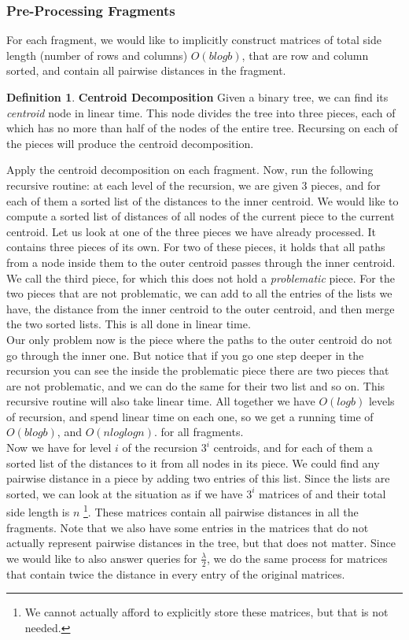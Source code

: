 \documentclass[11pt,a4paper]{article}
\theoremstyle{definition}
\newtheorem{definition}{Definition}
\theoremstyle{remark}
\begin{document}
\subsubsection{Pre-Processing Fragments} \label{Pre-Processing Fragments}
For each fragment, we would like to implicitly construct matrices of total side length (number of rows and columns) $O(blogb)$, that are row and column sorted, and contain all pairwise distances in the fragment.

\begin{definition} \textbf{Centroid Decomposition} %
Given a binary tree, we can find its \textit{centroid} node in linear time. This node divides the tree into three pieces, each of which has no more than half of the nodes of the entire tree. Recursing on each of the pieces will produce the centroid decomposition.
\end{definition}

Apply the centroid decomposition on each fragment. Now, run the following recursive routine: at each level of the recursion, we are given 3 pieces, and for each of them a sorted list of the distances to the inner centroid. We would like to compute a sorted list of distances of all nodes of the current piece to the current centroid. Let us look at one of the three pieces we have already processed. It contains three pieces of its own. For two of these pieces, it holds that all paths from a node inside them to the outer centroid passes through the inner centroid. We call the third piece, for which this does not hold a \textit{problematic} piece. For the two pieces that are not problematic, we can add to all the entries of the lists we have, the distance from the inner centroid to the outer centroid, and then merge the two sorted lists. This is all done in linear time.\\
Our only problem now is the piece where the paths to the outer centroid do not go through the inner one. But notice that if you go one step deeper in the recursion you can see the inside the problematic piece there are two pieces that are not problematic, and we can do the same for their two list and so on. This recursive routine will also take linear time. All together we have $O(logb)$ levels of recursion, and spend linear time on each one, so we get a running time of $O(blogb)$, and $O(nloglogn)$. for all fragments.\\
Now we have for level $i$ of the recursion $3^i$ centroids, and for each of them a sorted list of the distances to it from all nodes in its piece. We could find any pairwise distance in a piece by adding two entries of this list. Since the lists are sorted, we can look at the situation as if we have $3^i$ matrices of and their total side length is $n$ \footnote{We cannot actually afford to explicitly store these matrices, but that is not needed.}. These matrices contain all pairwise distances in all the fragments. Note that we also have some entries in the matrices that do not actually represent pairwise distances in the tree, but that does not matter.
Since we would like to also answer queries for $\frac{\lambda}{2}$, we do the same process for matrices that contain twice the distance in every entry of the original matrices.\\
\end{document}
